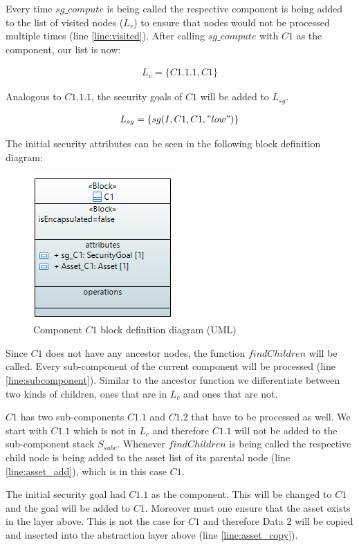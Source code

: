 Every time $sg\_compute$ is being called the respective component is being added to the list of visited nodes ($L_v$) to ensure that nodes would not be processed multiple times (line \ref{line:visited}). After calling $sg\_compute$ with $C1$ as the component, our list is now:

\begin{align*}
L_v = \{C1.1.1, C1\}
\end{align*}

Analogous to $C1.1.1$, the security goals of $C1$ will be added to $L_{sg}$.

\begin{align*}
L_{sg} = \{sg(I,C1,C1,"low")\}
\end{align*}

The initial security attributes can be seen in the following block definition diagram:

\begin{figure}[H]
\centering
        \includegraphics[scale=0.9]{pictures/block_c1}
    \caption{Component $C1$ block definition diagram (UML)}
\end{figure}

Since $C1$ does not have any ancestor nodes, the function $findChildren$ will be called.  Every sub-component of the current component will be processed (line \ref{line:subcomponent}). Similar to the ancestor function we differentiate between two kinds of children, ones that are in $L_c$ and ones that are not.

$C1$ has two sub-components $C1.1$ and $C1.2$ that have to be processed as well. We start with $C1.1$ which is not in $L_c$ and therefore $C1.1$ will not be added to the sub-component stack $S_{subc}$. Whenever $findChildren$ is being called the respective child node is being added to the asset list of its parental node (line \ref{line:asset_add}), which is in this case $C1$. 

The initial security goal had $C1.1$ as the component. This will be changed to $C1$ and the goal will be added to $C1$. Moreover must one ensure that the asset exists in the layer above. This is not the case for $C1$ and therefore Data 2 will be copied and inserted into the abstraction layer above (line \ref{line:asset_copy}).


